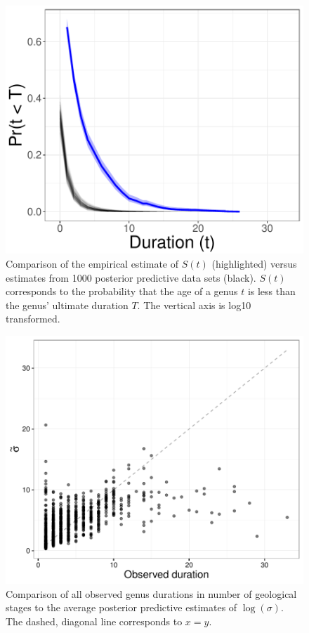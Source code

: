 \documentclass{article}
\begin{document}
\begin{figure}[ht]
  \centering
  \includegraphics[height = 0.5\textheight,width=\textwidth,keepaspectratio=true]{figure/survival_curves}
  \caption{Comparison of the empirical estimate of \(S(t)\) (highlighted) versus estimates from 1000 posterior predictive data sets (black). \(S(t)\) corresponds to the probability that the age of a genus \(t\) is less than the genus' ultimate duration \(T\). The vertical axis is log10 transformed.}
  \label{fig:surv}
\end{figure}

\begin{figure}[ht]
  \centering
  \includegraphics[height = 0.5\textheight,width=\textwidth,keepaspectratio=true]{figure/shotgun}
  \caption{Comparison of all observed genus durations in number of geological stages to the average posterior predictive estimates of \(\log(\sigma)\). The dashed, diagonal line corresponds to \(x = y\).}
  \label{fig:shot}
\end{figure}
\end{document}
